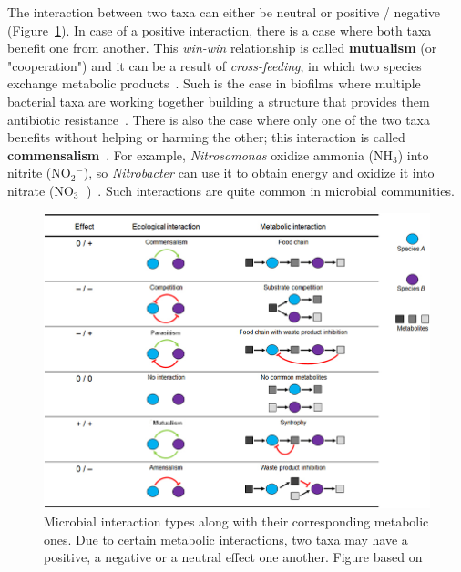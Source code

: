       The interaction between two taxa can either be neutral or 
      positive / negative (Figure~\ref{fig:micro-inter-types}).
      In case of a positive interaction, 
      there is a case where both taxa benefit one from another.
      This \textit{win-win} relationship is called \textbf{mutualism} (or "cooperation")
      and it can be a result of
      \textit{cross-feeding}, in which two species exchange metabolic products~\cite{faust2012microbial}.
      Such is the case in biofilms where multiple bacterial taxa are working together  
      building a structure that provides them antibiotic resistance~\cite{santos2019evolutionary}.
      There is also the case where only one of the two taxa
      benefits without helping or harming the other; 
      this interaction is called \textbf{commensalism}~\cite{faust2012microbial}. 
      For example, \textit{Nitrosomonas} oxidize ammonia (NH$_3$) into nitrite (NO${_2}^{-}$), so  
      \textit{Nitrobacter} can use it to obtain energy and oxidize it into nitrate (NO${_3}^{-}$)~\cite{laanbroek2002nitrite}.
      Such interactions are quite common in microbial communities.

      \begin{figure}[!h]
         \centering
         \includegraphics[width=.9\textwidth]{figures/interaction_types.jpg}
         \caption[Microbial interactions types]{Microbial interaction types along 
         with their corresponding metabolic ones.
         Due to certain metabolic interactions, two taxa may have a positive, a negative
         or a neutral effect one another. 
         Figure based on \cite{perez2016metabolic}}
         \label{fig:micro-inter-types}
      \end{figure}

